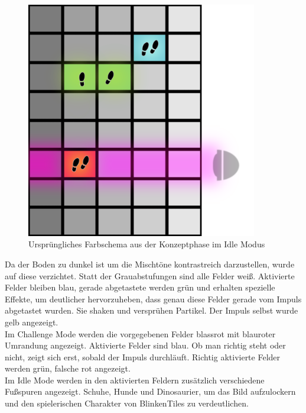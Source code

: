 \begin{figure}[htbp]
	\centering
		\includegraphics[width=0.9\textwidth]{images/designIdle.png}
	\caption{Ursprüngliches Farbschema aus der Konzeptphase im Idle Modus}
	\label{fig:Design}
\end{figure}

Da der Boden zu dunkel ist um die Mischtöne kontrastreich darzustellen, wurde auf diese verzichtet. Statt der Grauabstufungen sind alle Felder weiß. Aktivierte Felder bleiben blau, gerade abgetastete werden grün und erhalten spezielle Effekte, um deutlicher hervorzuheben, dass genau diese Felder gerade vom Impuls abgetastet wurden. Sie shaken und versprühen Partikel. Der Impuls selbst wurde gelb angezeigt.\\
Im Challenge Mode werden die vorgegebenen Felder blassrot mit blauroter Umrandung angezeigt. Aktivierte Felder sind blau. Ob man richtig steht oder nicht, zeigt sich erst, sobald der Impuls durchläuft. Richtig aktivierte Felder werden grün, falsche rot angezeigt.\\
Im Idle Mode werden in den aktivierten Feldern zusätzlich verschiedene Fußspuren angezeigt. Schuhe, Hunde und Dinosaurier, um das Bild aufzulockern und den spielerischen Charakter von BlinkenTiles zu verdeutlichen.






